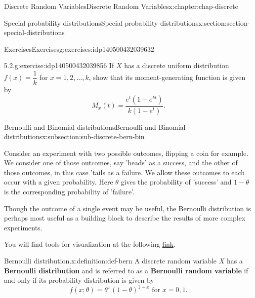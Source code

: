 \documentclass[oneside,10pt,]{book}
\newcommand{\terminology}[1]{\textbf{#1}}
\begin{document}
\begin{chapterptx}{Discrete Random Variables}{}{Discrete Random Variables}{}{}{x:chapter:chap-discrete}
\begin{sectionptx}{Special probability distributions}{}{Special probability distributions}{}{}{x:section:section-special-distributions}
%
%
\typeout{************************************************}
\typeout{************************************************}
%
\begin{exercises-subsection}{Exercises}{}{Exercises}{}{}{g:exercises:idp140500432039632}
\begin{divisionexercise}{1}{5.2.}{}{g:exercise:idp140500432039856}%
If \(X\) has a discrete uniform distribution \(f(x) =
\dfrac{1}{k}\) for \(x = 1, 2, \dots, k\), show that its moment-generating function is given by%
\begin{equation*}
M_x(t) =
\dfrac{e^t(1-e^{kt})}{k(1-e^t)}\text{.}
\end{equation*}
%
\end{divisionexercise}%
\end{exercises-subsection}
%
%
\typeout{************************************************}
\typeout{************************************************}
%
\begin{subsectionptx}{Bernoulli and Binomial distributions}{}{Bernoulli and Binomial distributions}{}{}{x:subsection:sub-discrete-bern-bin}
\begin{introduction}{}%
Consider an experiment with two possible outcomes, flipping a coin for example. We consider one of those outcomes, say 'heads' as a success, and the other of those outcomes, in this case 'tails\textasciigrave{} as a failure. We allow these outcomes to each occur with a given probability. Here \(\theta\) gives the probability of 'success' and \(1-\theta\) is the corresponding probability of 'failure'.%
\par
Though the outcome of a single event may be useful, the Bernoulli distribution is perhaps most useful as a building block to describe the results of more complex experiments.%
\par
You will find tools for visualization at the following \href{https://buddy.uco.edu/shiny/slaverty/mathstat/Binomial/}{link}.%
\end{introduction}%
\begin{definition}{Bernoulli distribution.}{x:definition:def-bern}%
A discrete random variable \(\displaystyle X\) has a \terminology{Bernoulli distribution} and is referred to as a \terminology{Bernoulli random variable} if and only if its probability distribution is given by%
\begin{equation*}
f(x; \theta) = \theta^x(1-\theta)^{1-x}
\text{ for }x = 0, 1\text{.}
\end{equation*}

\end{definition}
\end{subsectionptx}
\end{sectionptx}
\end{chapterptx}
\end{document}
